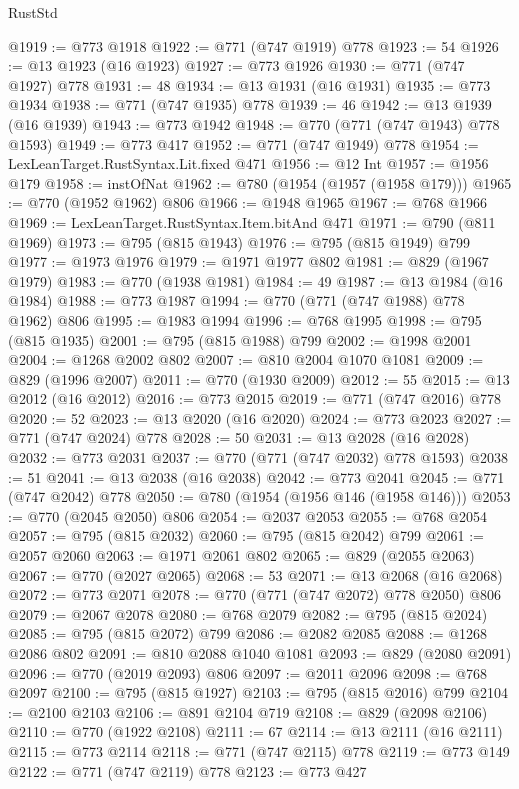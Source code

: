 \begin{lexlean}{RustStd}
\begin{coremodule}
{\begin{coremodule}
{{{{{{{{{{{{{{{@1919 := @773 @1918
@1922 := @771 (@747 @1919) @778
@1923 := 54
@1926 := @13 @1923 (@16 @1923)
@1927 := @773 @1926
@1930 := @771 (@747 @1927) @778
@1931 := 48
@1934 := @13 @1931 (@16 @1931)
@1935 := @773 @1934
@1938 := @771 (@747 @1935) @778
@1939 := 46
@1942 := @13 @1939 (@16 @1939)
@1943 := @773 @1942
@1948 := @770 (@771 (@747 @1943) @778 @1593)
@1949 := @773 @417
@1952 := @771 (@747 @1949) @778
@1954 := LexLeanTarget.RustSyntax.Lit.fixed @471
@1956 := @12 Int
@1957 := @1956 @179
@1958 := instOfNat
@1962 := @780 (@1954 (@1957 (@1958 @179)))
@1965 := @770 (@1952 @1962) @806
@1966 := @1948 @1965
@1967 := @768 @1966
@1969 := LexLeanTarget.RustSyntax.Item.bitAnd @471
@1971 := @790 (@811 @1969)
@1973 := @795 (@815 @1943)
@1976 := @795 (@815 @1949) @799
@1977 := @1973 @1976
@1979 := @1971 @1977 @802
@1981 := @829 (@1967 @1979)
@1983 := @770 (@1938 @1981)
@1984 := 49
@1987 := @13 @1984 (@16 @1984)
@1988 := @773 @1987
@1994 := @770 (@771 (@747 @1988) @778 @1962) @806
@1995 := @1983 @1994
@1996 := @768 @1995
@1998 := @795 (@815 @1935)
@2001 := @795 (@815 @1988) @799
@2002 := @1998 @2001
@2004 := @1268 @2002 @802
@2007 := @810 @2004 @1070 @1081
@2009 := @829 (@1996 @2007)
@2011 := @770 (@1930 @2009)
@2012 := 55
@2015 := @13 @2012 (@16 @2012)
@2016 := @773 @2015
@2019 := @771 (@747 @2016) @778
@2020 := 52
@2023 := @13 @2020 (@16 @2020)
@2024 := @773 @2023
@2027 := @771 (@747 @2024) @778
@2028 := 50
@2031 := @13 @2028 (@16 @2028)
@2032 := @773 @2031
@2037 := @770 (@771 (@747 @2032) @778 @1593)
@2038 := 51
@2041 := @13 @2038 (@16 @2038)
@2042 := @773 @2041
@2045 := @771 (@747 @2042) @778
@2050 := @780 (@1954 (@1956 @146 (@1958 @146)))
@2053 := @770 (@2045 @2050) @806
@2054 := @2037 @2053
@2055 := @768 @2054
@2057 := @795 (@815 @2032)
@2060 := @795 (@815 @2042) @799
@2061 := @2057 @2060
@2063 := @1971 @2061 @802
@2065 := @829 (@2055 @2063)
@2067 := @770 (@2027 @2065)
@2068 := 53
@2071 := @13 @2068 (@16 @2068)
@2072 := @773 @2071
@2078 := @770 (@771 (@747 @2072) @778 @2050) @806
@2079 := @2067 @2078
@2080 := @768 @2079
@2082 := @795 (@815 @2024)
@2085 := @795 (@815 @2072) @799
@2086 := @2082 @2085
@2088 := @1268 @2086 @802
@2091 := @810 @2088 @1040 @1081
@2093 := @829 (@2080 @2091)
@2096 := @770 (@2019 @2093) @806
@2097 := @2011 @2096
@2098 := @768 @2097
@2100 := @795 (@815 @1927)
@2103 := @795 (@815 @2016) @799
@2104 := @2100 @2103
@2106 := @891 @2104 @719
@2108 := @829 (@2098 @2106)
@2110 := @770 (@1922 @2108)
@2111 := 67
@2114 := @13 @2111 (@16 @2111)
@2115 := @773 @2114
@2118 := @771 (@747 @2115) @778
@2119 := @773 @149
@2122 := @771 (@747 @2119) @778
@2123 := @773 @427
}}}}}}}}}}}}}}}
\end{coremodule}}
\end{coremodule}
\end{lexlean}
